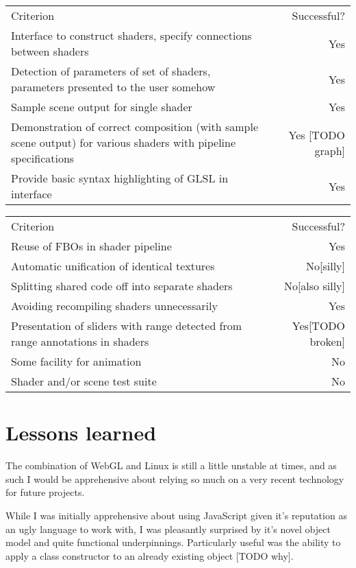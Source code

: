\documentclass[12pt,twoside,notitlepage]{report}
\begin{document}
\begin{table}
\begin{tabular}{p{9cm} | r}
Criterion & Successful? \\
Interface to construct shaders, specify connections between shaders & Yes \\
Detection of parameters of set of shaders, parameters presented to the user somehow & Yes \\
Sample scene output for single shader & Yes \\
Demonstration of correct composition (with sample scene output) for various shaders with pipeline specifications & Yes [TODO graph]\\
Provide basic syntax highlighting of GLSL in interface & Yes \\
\end{tabular}
\end{table}
\begin{table}
\begin{tabular}{p{9cm} | r}
Criterion & Successful? \\
Reuse of FBOs in shader pipeline & Yes \\
Automatic unification of identical textures & No[silly] \\
Splitting shared code off into separate shaders & No[also silly] \\
Avoiding recompiling shaders unnecessarily & Yes \\
Presentation of sliders with range detected from range annotations in shaders & Yes[TODO broken]\\
Some facility for animation & No \\
Shader and/or scene test suite & No \\
\end{tabular}
\end{table}
\section{Lessons learned}
The combination of WebGL and Linux is still a little unstable at times, and as such I would be apprehensive about relying so much on a very recent technology for future projects.

While I was initially apprehensive about using JavaScript given it's reputation as an ugly language to work with, I was pleasantly surprised by it's novel object model and quite functional underpinnings. Particularly useful was the ability to apply a class constructor to an already existing object [TODO why].
\end{document}
